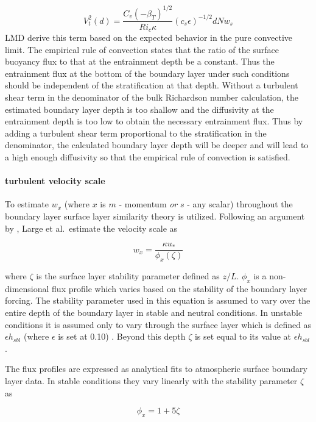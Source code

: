 \begin{equation}
  V_{t}^{2}(d)=\frac{C_v(-\beta_T)^{1/2}}{Ri_c
  \kappa}(c_s\epsilon)^{-1/2}dNw_s
\end{equation}
LMD derive this term based on the expected behavior in the pure
convective limit.  The empirical rule of convection states that the
ratio of the surface buoyancy flux to that at the entrainment depth be 
a constant.  Thus the entrainment flux at the
bottom of the boundary layer under such conditions should be
independent of the stratification at that depth.  Without a turbulent
shear term in the denominator of the bulk Richardson number
calculation, the estimated boundary layer depth is too shallow and the
diffusivity at the entrainment depth is too low to obtain the
necessary entrainment flux.  Thus by adding a turbulent shear term
proportional to the stratification in the denominator, the calculated
boundary layer depth will be deeper and will lead to a high enough
diffusivity so that the empirical rule of convection is satisfied.
  
\paragraph{turbulent velocity scale}
To estimate $w_x$ (where $x$ is $m$ - momentum {\em or} $s$
- any scalar) throughout the boundary layer surface layer similarity
theory is utilized.  Following an argument by
\cite{TM86}, Large et al.\ estimate the velocity scale as

\begin{equation}
w_x=\frac{\kappa u_*}{\phi_x(\zeta)}
\end{equation}

where $\zeta$ is the surface layer stability parameter defined as
$z/L$.  $\phi_x$ is a non-dimensional flux profile which varies based
on the stability of the boundary layer forcing.  The stability
parameter used in this equation is assumed to vary over the entire
depth of the boundary layer in stable and neutral conditions.  In
unstable conditions it is assumed only to vary through the surface
layer which is defined as $ \epsilon h_{sbl} $ (where $\epsilon$ is
set at 0.10) .  Beyond this depth $\zeta$
is set equal to its value at $ \epsilon h_{sbl} $.

The flux profiles are expressed as analytical fits to atmospheric
surface boundary layer data.  In stable conditions they vary linearly
with the stability parameter $\zeta$  as

\begin{equation}
\phi_x=1+5\zeta
\end{equation}

